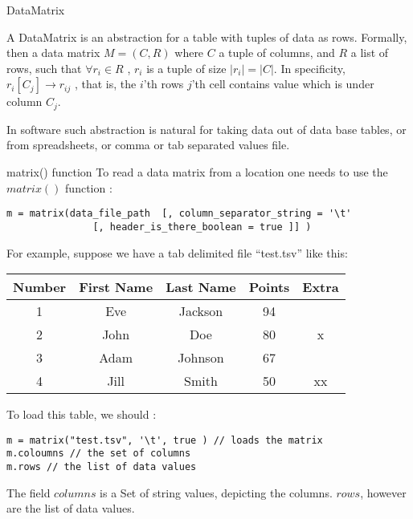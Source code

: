 \begin{section}{DataMatrix}

A DataMatrix is an abstraction for a table with tuples of data as rows.
Formally, then a data matrix $M = (C,R) $ where $C$ a tuple of columns,
and $R$ a list of rows, such that  $\forall r_i \in R$ , $r_i$ is a tuple
of size $|r_i| = |C|$. In specificity, $r_i[C_j] \to r_{ij}$ , that is, 
the $i$'th rows $j$'th cell contains value which is under column $C_j$.

In software such abstraction is natural for taking data out of data base tables, 
or from spreadsheets, or comma or tab separated values file.   

\begin{subsection}{matrix() function}
To read a data matrix from a location one needs to use the $matrix()$ function :

\begin{lstlisting}[style=JexlStyle]
m = matrix(data_file_path  [, column_separator_string = '\t' 
               [, header_is_there_boolean = true ]] )
\end{lstlisting}

For example, suppose we have a tab delimited file ``test.tsv''  like this:

\begin{center}\label{matrix}
\begin{tabular}{ |c|c|c|c|c| } 
 \hline
 Number	& First Name & Last Name & Points & Extra \\ 
 \hline 
   1    & Eve	     & Jackson	& 94      & \\
   2    & John       &  Doe	    & 80      &  x \\ 
   3    & Adam       & Johnson	& 67      &  \\	
   4    & Jill       & Smith	& 50      & xx \\  
 \hline
\end{tabular}
\end{center}

To load this table, we should :
 

\begin{lstlisting}[style=JexlStyle]
m = matrix("test.tsv", '\t', true ) // loads the matrix 
m.coloumns // the set of columns 
m.rows // the list of data values
\end{lstlisting}

The field $columns$ is a Set of string values, depicting the columns.
$rows$, however are the list of data values. 
 

\end{subsection}
\end{section}
